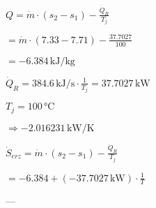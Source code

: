 \( Q = \dot{m} \cdot (s_{2} - s_{1}) - \frac{\dot{Q}_{R}}{T_{j}} \)  

\( = \dot{m} \cdot (7.33 - 7.71) - \frac{37.7027}{100} \)  

\( = -6.384 \, \text{kJ/kg} \)  

\( \dot{Q}_{R} = 384.6 \, \text{kJ/s} \cdot \frac{1}{T_{j}} = 37.7027 \, \text{kW} \)  

\( T_{j} = 100 \, \text{°C} \)  

\( \Rightarrow -2.016231 \, \text{kW/K} \)  

\( \dot{S}_{erz} = \dot{m} \cdot \left( s_{2} - s_{1} \right) - \frac{\dot{Q}_{R}}{T_{j}} \)  

\( = -6.384 + (-37.7027 \, \text{kW}) \cdot \frac{1}{T} \)  

---